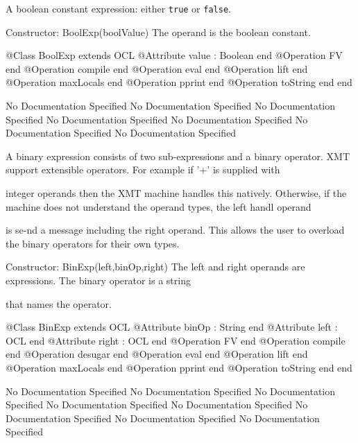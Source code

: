       A boolean constant expression: either {\tt true} or {\tt false}.
     
      Constructor: BoolExp(boolValue)
        The operand is the boolean constant.
\begin{Interface}
@Class BoolExp extends OCL
  @Attribute value : Boolean end
  @Operation FV end
  @Operation compile end
  @Operation eval end
  @Operation lift end
  @Operation maxLocals end
  @Operation pprint end
  @Operation toString end
end
\end{Interface}
No Documentation Specified
No Documentation Specified
No Documentation Specified
No Documentation Specified
No Documentation Specified
No Documentation Specified
No Documentation Specified

      A binary expression consists of two sub-expressions and a binary operator.
      XMT support extensible operators. For example if '+' is supplied with

      integer operands then the XMT machine handles this natively. Otherwise, 
      if the machine does not understand the operand types, the left handl operand

      is se-nd a message including the right operand. This allows the user to 
      overload the binary operators for their own types.
    
      Constructor: BinExp(left,binOp,right)
        The left and right operands are expressions. The binary operator is a string

        that names the operator.
\begin{Interface}
@Class BinExp extends OCL
  @Attribute binOp : String end
  @Attribute left : OCL end
  @Attribute right : OCL end
  @Operation FV end
  @Operation compile end
  @Operation desugar end
  @Operation eval end
  @Operation lift end
  @Operation maxLocals end
  @Operation pprint end
  @Operation toString end
end
\end{Interface}
No Documentation Specified
No Documentation Specified
No Documentation Specified
No Documentation Specified
No Documentation Specified
No Documentation Specified
No Documentation Specified
No Documentation Specified

